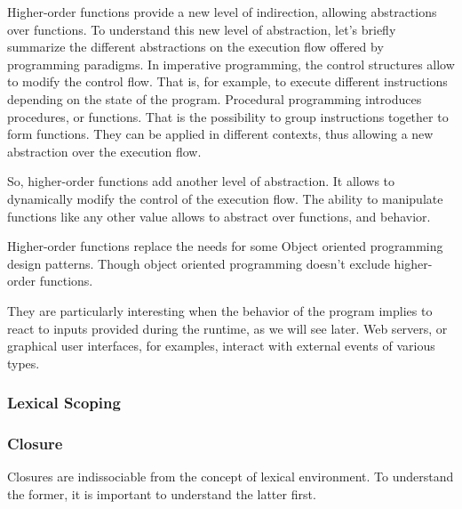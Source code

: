 Higher-order functions provide a new level of indirection, allowing abstractions over functions.
To understand this new level of abstraction, let's briefly summarize the different abstractions on the execution flow offered by programming paradigms.
In imperative programming, the control structures allow to modify the control flow. That is, for example, to execute different instructions depending on the state of the program.
Procedural programming introduces procedures, or functions. That is the possibility to group instructions together to form functions.
They can be applied in different contexts, thus allowing a new abstraction over the execution flow.

So, higher-order functions add another level of abstraction.
It allows to dynamically modify the control of the execution flow.
The ability to manipulate functions like any other value allows to abstract over functions, and behavior.

Higher-order functions replace the needs for some Object oriented programming design patterns. Though object oriented programming doesn't exclude higher-order functions.

They are particularly interesting when the behavior of the program implies to react to inputs provided during the runtime, as we will see later.
Web servers, or graphical user interfaces, for examples, interact with external events of various types.


\subsubsection{Lexical Scoping}


\subsubsection{Closure}


Closures are indissociable from the concept of lexical environment.
To understand the former, it is important to understand the latter first.

